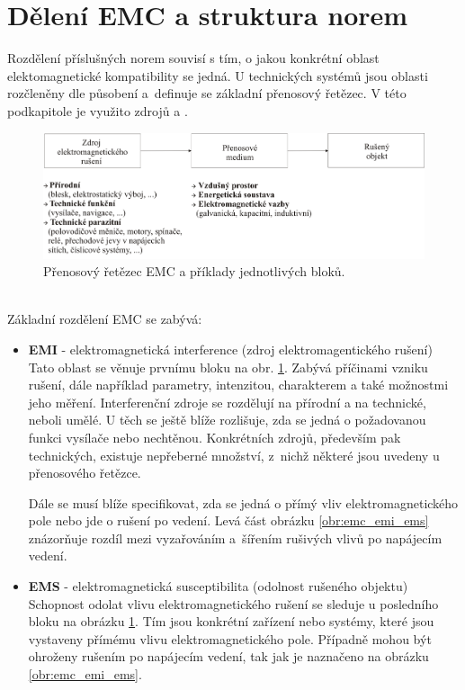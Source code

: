 \section{Dělení EMC a struktura norem}
Rozdělení příslušných norem souvisí s tím, o jakou konkrétní oblast elektomagnetické kompatibility se jedná. U technických systémů jsou oblasti rozčleněny dle působení a~definuje se základní přenosový řetězec. V této podkapitole je využito zdrojů \cite{nfr} a \cite{emc_encyklopedie}.
\begin{figure}[!h]
	\centering
	\includegraphics[width=14.6cm]{emc_retezec.png}
	\caption{Přenosový řetězec EMC a příklady jednotlivých bloků.}
	\label{obr:emc_retezec}
\end{figure}\\
Základní rozdělení EMC se zabývá:
\begin{itemize}
\item {\bf EMI} - elektromagnetická interference (zdroj elektromagentického rušení) \\
Tato oblast se věnuje prvnímu bloku na obr. \ref{obr:emc_retezec}. Zabývá příčinami vzniku rušení, dále například parametry, intenzitou, charakterem a také možnostmi jeho měření. Interferenční zdroje se rozdělují na přírodní a na technické, neboli umělé. U těch se ještě blíže rozlišuje, zda se jedná o požadovanou funkci vysílače nebo nechtěnou. Konkrétních zdrojů, především pak technických, existuje nepřeberné množství, z~nichž některé jsou uvedeny u přenosového řetězce.

Dále se musí blíže specifikovat, zda se jedná o přímý vliv elektromagnetického pole nebo jde o rušení po vedení. Levá část obrázku \ref{obr:emc_emi_ems} znázorňuje rozdíl mezi vyzařováním a~šířením rušivých vlivů po napájecím vedení.

\item {\bf EMS} - elektromagnetická susceptibilita (odolnost rušeného objektu) \\
Schopnost odolat vlivu elektromagnetického rušení se sleduje u posledního bloku na obrázku \ref{obr:emc_retezec}. Tím jsou konkrétní zařízení nebo systémy, které jsou vystaveny přímému vlivu elektromagnetického pole. Případně mohou být ohroženy rušením po napájecím vedení, tak jak je naznačeno na obrázku \ref{obr:emc_emi_ems}.
\end{itemize}
